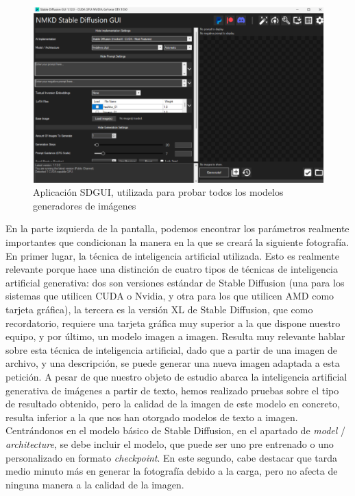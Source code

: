 \begin{figure}[h]
	\centering
	\includegraphics[width = 1
	\textwidth]{Imagenes/Vectorial/nmkdsdgui.png}
	\caption{Aplicación SDGUI, utilizada para probar todos los modelos generadores de imágenes }
	\label{fig:nmkdsdgui}
\end{figure}

En la parte izquierda de la pantalla, podemos encontrar los parámetros realmente importantes que condicionan la manera en la que se creará la siguiente fotografía. En primer lugar, la técnica de inteligencia artificial utilizada. Esto es realmente relevante porque hace una distinción de cuatro tipos de técnicas de inteligencia artificial generativa: dos son versiones estándar de Stable Diffusion (una para los sistemas que utilicen CUDA o Nvidia, y otra para los que utilicen AMD como tarjeta gráfica), la tercera es la versión XL de Stable Diffusion, que como recordatorio, requiere una tarjeta gráfica muy superior a la que dispone nuestro equipo, y por último, un modelo imagen a imagen. Resulta muy relevante hablar sobre esta técnica de inteligencia artificial, dado que a partir de una imagen de archivo, y una descripción, se puede generar una nueva imagen adaptada a esta petición. A pesar de que nuestro objeto de estudio abarca la inteligencia artificial generativa de imágenes a partir de texto, hemos realizado pruebas sobre el tipo de resultado obtenido, pero la calidad de la imagen de este modelo en concreto, resulta inferior a la que nos han otorgado modelos de texto a imagen. Centrándonos en el modelo básico de Stable Diffusion, en el apartado de \textit{model} / \textit{architecture}, se debe incluir el modelo, que puede ser uno pre entrenado o uno personalizado en formato \textit{checkpoint}. En este segundo, cabe destacar que tarda medio minuto más en generar la fotografía debido a la carga, pero no afecta de ninguna manera a la calidad de la imagen. \\

